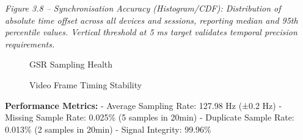 \documentclass[12pt,a4paper]{article}
\begin{document}
\emph{Figure 3.8 -- Synchronisation Accuracy (Histogram/CDF): Distribution of absolute time offset across all devices and sessions, reporting median and 95th percentile values. Vertical threshold at 5 ms target validates temporal precision requirements.}

\begin{figure}
\centering
{}
\caption{GSR Sampling Health}
\end{figure}

\begin{figure}
\centering
{}
\caption{Video Frame Timing Stability}
\end{figure}

\textbf{Performance Metrics:} - Average Sampling Rate: 127.98 Hz (±0.2 Hz) - Missing Sample Rate: 0.025\% (5 samples in 20min) - Duplicate Sample Rate: 0.013\% (2 samples in 20min) - Signal Integrity: 99.96\%
\end{document}

